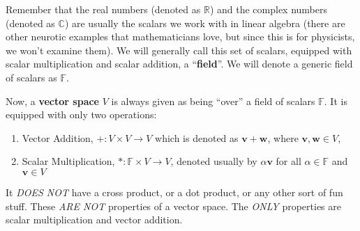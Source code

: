 Remember that the real numbers (denoted as $\mathbb{R}$) and
the complex numbers (denoted as $\mathbb{C}$) are usually
the scalars we work with in linear algebra (there are other
neurotic examples that mathematicians love, but since this
is for physicists, we won't examine them). We will generally
call this set of scalars, equipped with scalar
multiplication and scalar addition, a
``\textbf{field}''. We
will denote a generic field of scalars as $\mathbb{F}$.

Now, a \textbf{vector space} $V$ is always given as being ``over'' a
field of scalars $\mathbb{F}$. It is equipped with only two
operations:
\begin{enumerate}
\item Vector Addition, $+:V\times V\to V$ which is denoted
  as $\mathbf{v}+\mathbf{w}$, where
  $\mathbf{v},\mathbf{w}\in V$,
\item Scalar Multiplication, $*:\mathbb{F}\times V\to V$,
  denoted usually by $\alpha\mathbf{v}$ for all
  $\alpha\in\mathbb{F}$ and $\mathbf{v}\in V$
\end{enumerate}
It \emph{DOES NOT} have a cross product, or a dot product,
or any other sort of fun stuff. These \emph{ARE NOT}
properties of a vector space. The \emph{ONLY} properties are
scalar multiplication and vector addition. 


